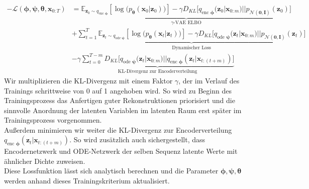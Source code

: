 \documentclass[12pt]{article}
\newcommand{\E}{\mathbb{E}}
\newcommand{\z}{\mathbf{z}}
\begin{document}
	\begin{align*}
	-\mathcal{L}(\boldsymbol\phi,\boldsymbol\psi,\boldsymbol\theta,\mathbf{x}_{0:T}) &=\underbrace{\E_{\mathbf{z}_{0}\sim q_{\text{enc }\boldsymbol\phi}}
		\left[\log\big(p_{\boldsymbol\theta}\left(\mathbf{x}_{0}|\mathbf{z}_{0}\right)\big)\right] - \gamma D_{KL}\big[q_{\text{enc }\boldsymbol\phi}(\mathbf{z}_{0}|\mathbf{x}_{0:m})||p_{\mathcal{N}(\mathbf{0},\mathbf{I})}(\z_0)\big]}_{\gamma\text{-VAE ELBO}}\\ &+ \underbrace{\sum_{t=1}^T \E_{\mathbf{z}_{t}\sim q_{\text{ode }\boldsymbol\psi}}
		\left[\log\big(p_{\boldsymbol\theta}\left(\mathbf{x}_{t}|\mathbf{z}_{t}\right)\big)\right] - \gamma D_{KL}\big[q_{\text{ode }\boldsymbol\psi}(\mathbf{z}_{t}|\mathbf{x}_{0:m})||p_{\mathcal{N}(\mathbf{0},\mathbf{I})}(\z_t)\big]}_{\text{Dynamischer Loss}} \\ &- \gamma \underbrace{\sum_{t=0}^{T-m} D_{KL}\big[q_{\text{ode }\boldsymbol\psi}(\mathbf{z}_{t}|\mathbf{x}_{0:m})||q_{\text{enc }\boldsymbol\phi}(\mathbf{z}_{t}|\mathbf{x}_{t:(t+m)})\big]}_{\text{KL-Divergenz zur Encoderverteilung}}
	\end{align*}
	Wir multiplizieren die KL-Divergenz mit einem Faktor $\gamma$, der im Verlauf des Trainings schrittweise von 0 auf 1 angehoben wird. So wird zu Beginn des Trainingsprozess das Anfertigen guter Rekonstruktionen priorisiert und die sinnvolle
	Anordnung der latenten Variablen im latenten Raum erst später im Trainingsprozess vorgenommen.\\
	Außerdem minimieren wir weiter die KL-Divergenz zur Encoderverteilung $q_{\text{enc }\boldsymbol\phi}(\mathbf{z}_{t}|\mathbf{x}_{t:(t+m)})$. So wird zusätzlich auch sichergestellt, dass Encodernetzwerk und ODE-Netzwerk der selben Sequenz latente Werte mit ähnlicher Dichte zuweisen.\\
	Diese Lossfunktion lässt sich analytisch berechnen und die Parameter $\boldsymbol\phi,\boldsymbol\psi,\boldsymbol\theta$ werden anhand dieses Trainingskriterium aktualisiert.\\
\end{document}
